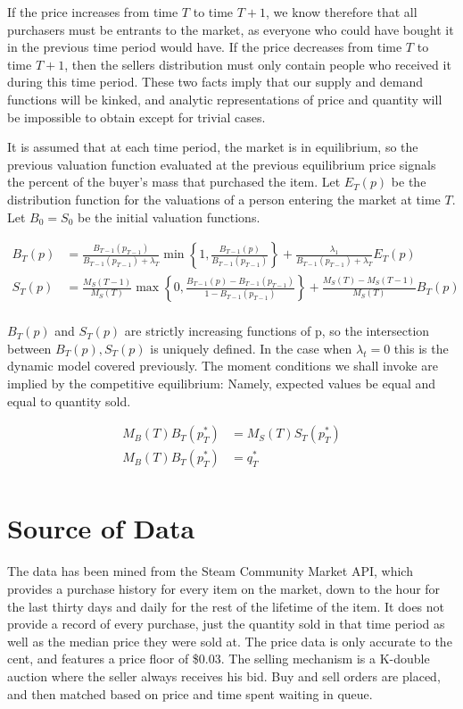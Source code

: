 \documentclass[12pt, letterpaper]{paper}
\begin{document}
If the price increases from time $T$ to time $T+1$, we know therefore that
all purchasers must be entrants to the market, as everyone who could
have bought it in the previous time period would have. If the price
decreases from time $T$ to time $T+1$, then the sellers distribution must
only contain people who received it during this time period. These two
facts imply that our supply and demand functions will be kinked, and
analytic representations of price and quantity will be impossible to
obtain except for trivial cases.

It is assumed that at each time period, the market is in equilibrium, so
the previous valuation function evaluated at the previous equilibrium
price signals the percent of the buyer's mass that purchased the
item. Let $E_T (p)$ be the distribution function for the valuations of
a person entering the market at time $T$. Let $B_0 = S_0$ be the initial
valuation functions.

\begin{align*}
B_T (p) &= \frac{ B_{T-1 }(p_{T-1}) }{ B_{T-1 }(p_{T-1}) + \lambda_T } \min \left \{ 1, \frac{ B_{T-1} ( p ) }{B_{T-1 }(p_{T-1 })} \right \}
 + \frac{ \lambda_1 }{ B_{T-1 }(p_{T-1}) + \lambda_T } E_T (p) \\
S_T (p) &= \frac{ M_S(T-1) }{ M_S(T) } \max \left \{ 0, \frac{ B_{T-1}(p) - B_{T-1}( p_{T-1} ) }{ 1 - B_{T-1} ( p_{T-1} ) } \right \} + \frac{ M_S(T) - M_S(T-1)_{} }{M_S(T)} B_T (p)\\
\end{align*} 

$B_T(p)$ and $S_T(p)$ are strictly increasing functions of p, so the
intersection between $B_T(p), S_T (p)$ is uniquely defined. In the case when
$\lambda_t = 0$ this is the dynamic model covered previously. The moment
conditions we shall invoke are implied by the competitive equilibrium:
Namely, expected values be equal and equal to quantity sold.

\begin{align*}
M_B(T) B_T(p_T^*) &= M_S (T) S_T (p_T^*)\\
M_B(T) B_T (p_T^*) & = q_T^*\\
\end{align*}



\section{Source of Data}
\label{sec-3}
The data has been mined from the Steam Community Market API, which
provides a purchase history for every item on the market, down to the
hour for the last thirty days and daily for the rest of the lifetime
of the item. It does not provide a record of every purchase, just the
quantity sold in that time period as well as the median price they
were sold at. The price data is only accurate to the cent, and
features a price floor of \$0.03. The selling mechanism is a K-double
auction where the seller always receives his bid. Buy and sell orders are
placed, and then matched based on price and time spent waiting in queue.
\end{document}
